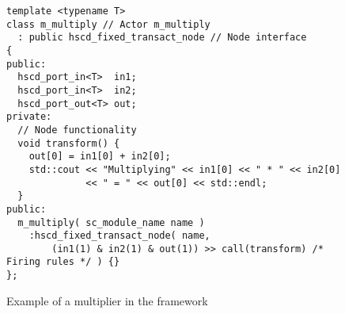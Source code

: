 \begin{figure}[h]
\centering
\begin{verbatim}
template <typename T>
class m_multiply // Actor m_multiply
  : public hscd_fixed_transact_node // Node interface
{
public:
  hscd_port_in<T>  in1;
  hscd_port_in<T>  in2;
  hscd_port_out<T> out;
private:
  // Node functionality
  void transform() {
    out[0] = in1[0] + in2[0];
    std::cout << "Multiplying" << in1[0] << " * " << in2[0]
              << " = " << out[0] << std::endl;
  }
public:
  m_multiply( sc_module_name name )
    :hscd_fixed_transact_node( name,
        (in1(1) & in2(1) & out(1)) >> call(transform) /* Firing rules */ ) {}
};
\end{verbatim}
\caption{\label{example-multiply-actor}Example of a multiplier in the \SysteMoC{} framework}
\end{figure}

%  

%  

